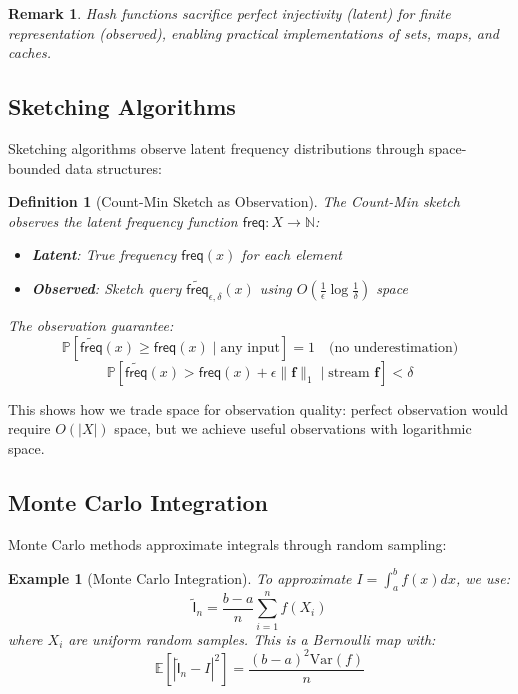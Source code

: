 \documentclass[11pt,final,hidelinks]{article}
\newtheorem{definition}[theorem]{Definition}
\newtheorem{example}[theorem]{Example}
\newtheorem{remark}[theorem]{Remark}
\newcommand{\obs}[1]{\widetilde{#1}}  %
\newcommand{\AFun}[1]{\obs{\mathsf{#1}}}  %
\newcommand{\ProbCond}[2]{\mathbb{P}\left[#1 \mid #2\right]}
\newcommand{\Expect}[1]{\mathbb{E}\left[#1\right]}
\begin{document}
\begin{remark}
Hash functions sacrifice perfect injectivity (latent) for finite representation (observed), enabling practical implementations of sets, maps, and caches.
\end{remark}

\subsection{Sketching Algorithms}

Sketching algorithms observe latent frequency distributions through space-bounded data structures:

\begin{definition}[Count-Min Sketch as Observation]
The Count-Min sketch \cite{cormode2005} observes the latent frequency function $\mathsf{freq} : X \to \mathbb{N}$:
\begin{itemize}
    \item \textbf{Latent}: True frequency $\mathsf{freq}(x)$ for each element
    \item \textbf{Observed}: Sketch query $\obs{\mathsf{freq}}_{\epsilon,\delta}(x)$ using $O(\frac{1}{\epsilon} \log \frac{1}{\delta})$ space
\end{itemize}
The observation guarantee:
\begin{equation}
\ProbCond{\obs{\mathsf{freq}}(x) \geq \mathsf{freq}(x)}{\text{any input}} = 1 \quad \text{(no underestimation)}
\end{equation}
\begin{equation}
\ProbCond{\obs{\mathsf{freq}}(x) > \mathsf{freq}(x) + \epsilon \|\mathbf{f}\|_1}{\text{stream } \mathbf{f}} < \delta
\end{equation}
\end{definition}

This shows how we trade space for observation quality: perfect observation would require $O(|X|)$ space, but we achieve useful observations with logarithmic space.

\subsection{Monte Carlo Integration}

Monte Carlo methods approximate integrals through random sampling:

\begin{example}[Monte Carlo Integration]
To approximate $I = \int_a^b f(x) dx$, we use:
\begin{equation}
\AFun{I}_n = \frac{b-a}{n} \sum_{i=1}^n f(X_i)
\end{equation}
where $X_i$ are uniform random samples. This is a Bernoulli map with:
\begin{equation}
\Expect{|\AFun{I}_n - I|^2} = \frac{(b-a)^2 \text{Var}(f)}{n}
\end{equation}
\end{example}
\end{document}
